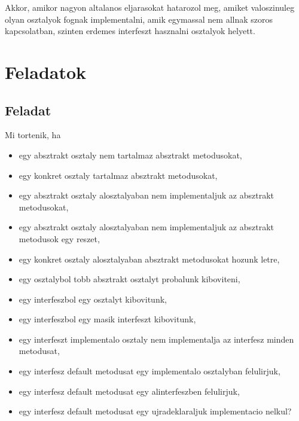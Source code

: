 \documentclass{article}
\begin{document}
Akkor, amikor nagyon altalanos eljarasokat hatarozol meg, amiket valoszinuleg olyan osztalyok fognak implementalni, amik egymassal nem allnak szoros kapcsolatban, szinten erdemes interfeszt hasznalni osztalyok helyett.

\newpage

\section{Feladatok}

\subsection{Feladat}

Mi tortenik, ha
\begin{itemize}
    \item egy absztrakt osztaly nem tartalmaz absztrakt metodusokat,
    \item egy konkret osztaly tartalmaz absztrakt metodusokat,
    \item egy absztrakt osztaly alosztalyaban nem implementaljuk az absztrakt metodusokat,
    \item egy absztrakt osztaly alosztalyaban nem implementaljuk az absztrakt metodusok egy reszet,
    \item egy konkret osztaly alosztalyaban absztrakt metodusokat hozunk letre,
    \item egy osztalybol tobb absztrakt osztalyt probalunk kiboviteni,
    \item egy interfeszbol egy osztalyt kibovitunk,
    \item egy interfeszbol egy masik interfeszt kibovitunk,
    \item egy interfeszt implementalo osztaly nem implementalja az interfesz minden metodusat,
    \item egy interfesz default metodusat egy implementalo osztalyban felulirjuk,
    \item egy interfesz default metodusat egy alinterfeszben felulirjuk,
    \item egy interfesz default metodusat egy ujradeklaraljuk implementacio nelkul?
\end{itemize}
\end{document}
